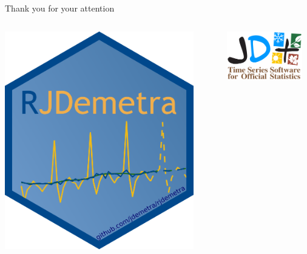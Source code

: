 \documentclass[10pt,xcolor=table,color={dvipsnames,usenames},ignorenonframetext,usepdftitle=false,french]{beamer}
\begin{document}
\begin{frame}{Thank you for your attention}
\protect\hypertarget{thank-you-for-your-attention}{}

\bigskip

\begin{columns}
\begin{column}{0.33\textwidth}
\begin{center}
\includegraphics[width=0.9\textwidth]{img/rjdemetra_logo.png}
\end{center}
\end{column}
\begin{column}{0.33\textwidth}
\begin{center}
\includegraphics[width=0.9\textwidth]{img/jdemetra+.png}

\end{center}
\end{column}
\end{columns}
\end{frame}
\end{document}
